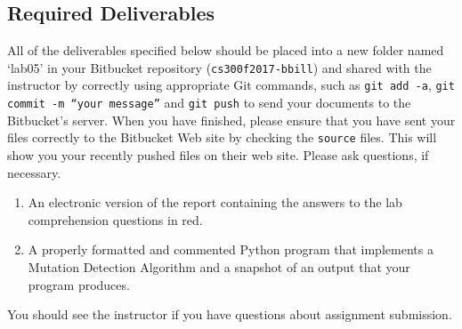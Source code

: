 \subsection*{Required Deliverables}
\vspace*{-.1in}
All of the deliverables specified below should be placed into a new folder named `lab05' in your Bitbucket repository ({\tt cs300f2017-bbill})  and shared with the instructor by correctly using  appropriate Git commands, such as {\tt git add -a}, {\tt git commit -m ``your message''} and {\tt git push} to send your documents to the Bitbucket's server. When you have finished, please ensure that you have sent your files correctly to the Bitbucket Web site by checking the {\tt source} files. This will show you your recently pushed files on their web site. Please ask questions, if necessary.
\color{red}
\begin{enumerate}
	\item An electronic version of the report containing the answers to the lab comprehension questions in red.
	\item A properly formatted and commented Python program that implements a Mutation Detection Algorithm and a snapshot of an output that your program produces.
\end{enumerate}
\color{black}

\noindent You should see the instructor if you have questions about assignment submission.




